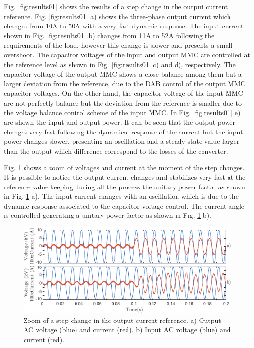 \documentclass[conference]{IEEEtran}
\begin{document}
Fig. \ref{fig:results01} shows the results of a step change in the output current reference. Fig.  \ref{fig:results01} a) shows the three-phase output current which changes from 10A to 50A with a very fast dynamic response. The input current shown in Fig.  \ref{fig:results01} b) changes from 11A to 52A following the requirements of the load, however this change is slower and presents a small overshoot.  The capacitor voltages of the input and output MMC are controlled at the reference level  as shown in Fig.  \ref{fig:results01} c) and d), respectively.  The capacitor voltage of the output MMC shows a close balance among them but a larger deviation from the reference, due to the DAB control of the output MMC capacitor voltages. On the other hand,  the capacitor voltage of the input MMC  are not perfectly balance but the deviation from the reference is smaller due to the voltage balance control scheme of the input MMC. In Fig. \ref{fig:results01} e) are shown the input and output power. It can be seen that the output power changes very fast following the dynamical response of the current but the input power changes slower, presenting an oscillation and a steady state value larger than the output which difference correspond to the losses of the converter.   




Fig. \ref{fig:results02} shows a zoom of voltages and current at the moment of the step changes. It is possible to notice the output current changes and stabilizes very fast at the reference value keeping during all the process the unitary power factor as shown in Fig. \ref{fig:results02} a). The input current changes with an oscillation which is due to the dynamic response associated to the capacitor voltage control.  The current angle is controlled generating a unitary power factor as shown in Fig. \ref{fig:results02} b).

\begin{figure}[!t]
\centering
\includegraphics[width=\columnwidth]{images/results02.pdf}
\caption{Zoom of a step change in the output current reference. a) Output AC voltage (blue) and current (red). b) Input AC voltage (blue) and current (red).}
\label{fig:results02}
\end{figure}
\end{document}
